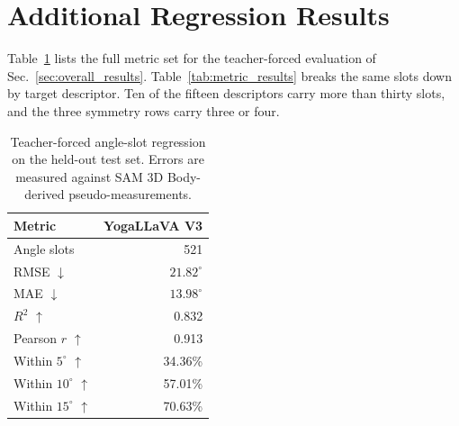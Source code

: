 \section{Additional Regression Results}
\label{app:additional_results}

Table~\ref{tab:overall_results} lists the full metric set for the teacher-forced evaluation of Sec.~\ref{sec:overall_results}.
Table~\ref{tab:metric_results} breaks the same slots down by target descriptor.
Ten of the fifteen descriptors carry more than thirty slots, and the three symmetry rows carry three or four.

\begin{table}[h]
    \centering
    \caption{Teacher-forced angle-slot regression on the held-out test set.
    Errors are measured against SAM 3D Body-derived pseudo-measurements.}
    \label{tab:overall_results}
    \begin{tabular}{lr}
        \toprule
        \textbf{Metric} & \textbf{YogaLLaVA V3} \\
        \midrule
        Angle slots & 521 \\
        RMSE $\downarrow$ & $21.82^\circ$ \\
        MAE $\downarrow$ & $13.98^\circ$ \\
        $R^2$ $\uparrow$ & 0.832 \\
        Pearson $r$ $\uparrow$ & 0.913 \\
        Within $5^\circ$ $\uparrow$ & 34.36\% \\
        Within $10^\circ$ $\uparrow$ & 57.01\% \\
        Within $15^\circ$ $\uparrow$ & 70.63\% \\
        \bottomrule
    \end{tabular}
\end{table}

